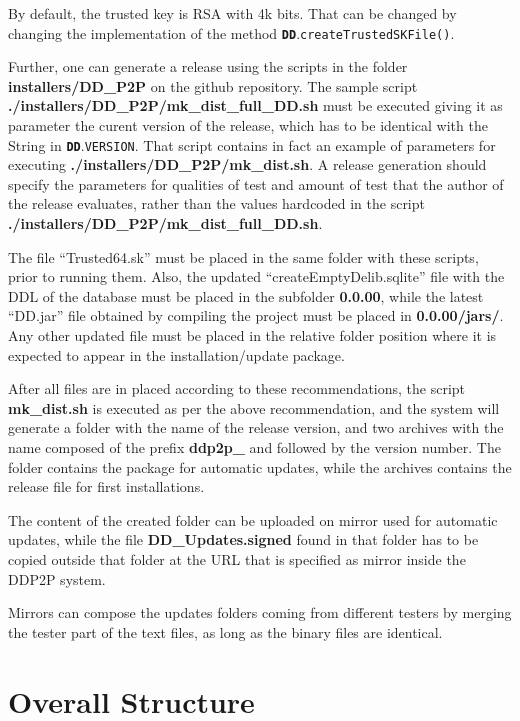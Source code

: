 \documentclass{book}
\newcommand{\cls}[1]{{\tt\bf #1}}
\newcommand{\mth}[1]{{\tt #1}}
\newcommand{\mmb}[1]{{\tt #1}}
\begin{document}
By default, the trusted key is RSA with 4k bits. That can be changed by changing the 
implementation of the method \cls{DD}.\mth{createTrustedSKFile()}.

Further, one can generate a release using the scripts in the folder {\bf installers/DD\_P2P} on the github
repository. The sample script {\bf ./installers/DD\_P2P/mk\_dist\_full\_DD.sh} must be executed giving it as parameter the curent version of the release, which has to be identical with the String in \cls{DD}.\mmb{VERSION}.
That script contains in fact an example of parameters for executing {\bf ./installers/DD\_P2P/mk\_dist.sh}.
A release generation should specify the parameters for qualities of test and amount of test that the
author of the release evaluates, rather than the values hardcoded in the script {\bf ./installers/DD\_P2P/mk\_dist\_full\_DD.sh}.

The file ``Trusted64.sk'' must be placed in the same folder with these scripts, prior to running them.
Also, the updated ``createEmptyDelib.sqlite'' file with the DDL of the database must be placed
in the subfolder {\bf 0.0.00}, while the latest ``DD.jar'' file obtained by compiling the project 
must be placed in {\bf 0.0.00/jars/}. Any other updated file must be placed in the relative
folder position where it is expected to appear in the installation/update package.

After all files are in placed according to these recommendations, the script {\bf mk\_dist.sh}
is executed as per the above recommendation, and the system will generate a folder with the
name of the release version, and two archives with the name composed of the prefix {\bf ddp2p\_}
and followed by the version number. The folder contains the package for automatic updates,
while the archives contains the release file for first installations.

The content of the created folder can be uploaded on mirror used for automatic updates,
while the file {\bf DD\_Updates.signed} found in that folder has to be copied outside that folder
at the URL that is specified as mirror inside the DDP2P system.

Mirrors can compose the updates folders coming from different testers by merging the tester part
of the text files, as long as the binary files are identical.

\section{Overall Structure}
\end{document}
